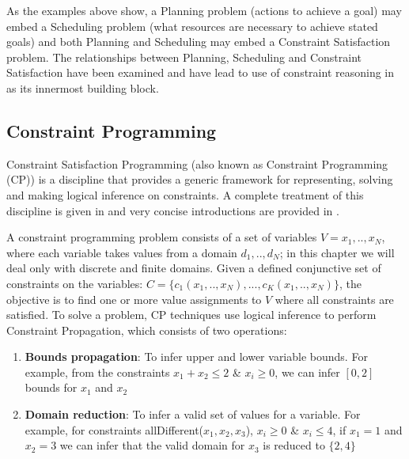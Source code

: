 As the examples above show, a Planning problem (actions to achieve a
goal) may embed a Scheduling problem (what resources are necessary to
achieve stated goals) and both Planning and Scheduling may embed a
Constraint Satisfaction problem. 
The relationships between Planning, Scheduling and Constraint
Satisfaction have been examined \cite{smith00} and have lead to use of
constraint reasoning in \eu as its innermost building block. 

\subsection{Constraint Programming}
\label{sec:europa:cp}

Constraint Satisfaction Programming (also known as Constraint
Programming (\textsf{CP})) is a discipline that provides a generic framework
for representing, solving and making logical inference on
constraints. A complete treatment of this discipline is given in
\cite{marriott98,apt03} and very concise introductions are provided in
\cite{bartak99,lustig01}.

A constraint programming problem consists of a set of variables $V=
{x_1,..,x_N}$, where each variable takes values from a domain
$d_1,..,d_N$; in this chapter we will deal only with discrete and
finite domains. Given a defined conjunctive set of constraints on the
variables: $C=\{c_1(x_1,..,x_N), ..., c_K(x_1,..,x_N)\}$, the
objective is to find one or more value assignments to $V$ where all
constraints are satisfied. To solve a problem, \textsf{CP} techniques use
logical inference to perform Constraint Propagation, which consists of
two operations:

\begin{enumerate}

\item \textbf{Bounds propagation}: To infer upper and lower variable
  bounds. For example, from the constraints $x_1 + x_2 \leq 2$ \&
  $x_i \geq 0$, we can infer $[0,2]$ bounds for $x_1$ and $x_2$

\item \textbf{Domain reduction}: To infer a valid set of values for a variable.
  For example, for  constraints allDifferent($x_1,x_2,x_3$), $x_i \geq
  0$ \& $x_i \leq 4$, if $x_1 = 1$ and $x_2 = 3$ we can infer that the
  valid domain for $x_3$ is reduced  to $\{2,4\}$

\end{enumerate}

